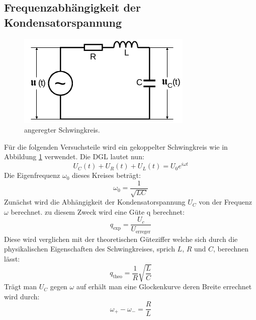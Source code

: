 \subsection{Frequenzabhängigkeit der Kondensatorspannung}

\begin{figure}[H]
  \centering
  \includegraphics{content/images/kreis2.png}
  \caption{angeregter Schwingkreis.}
  \label{fig:kreis2}
\end{figure}

Für die folgenden Versuchsteile wird ein gekoppelter Schwingkreis
wie in Abbildung \ref{fig:kreis2} verwendet. Die DGL lautet nun:
\begin{equation}
  U_C(t)+U_R(t)+U_L(t)=U_0e^{i\omega t}
  \label{eqn:kreis3}
\end{equation}
Die Eigenfrequenz $\omega_0$ dieses Kreises beträgt:
\begin{equation}
  \omega_0=\frac{1}{\sqrt{LC}}
  \label{eqn:eigen}
\end{equation}
Zunächst wird die Abhängigkeit
der Kondensatorspannung $U_C$ von der Frequenz $\omega$ berechnet.
zu diesem Zweck wird eine Güte q berechnet:
\begin{equation}
  q_\text{exp}=\frac{U_c}{U_\text{erreger}}
  \label{eqn:qexp}
\end{equation}
Diese wird verglichen mit der theoretischen Güteziffer welche sich durch die physikalischen
Eigenschaften des Schwingkreises, sprich $L$, $R$ und $C$, berechnen lässt:
\begin{equation}
  q_\text{theo}=\frac{1}{R}\sqrt{\frac{L}{C}}
    \label{eqn:qtheo}
\end{equation}
Trägt man $U_C$ gegen $\omega$ auf erhält man eine Glockenkurve deren Breite errechnet wird durch:
\begin{equation}
  \omega_+-\omega_-=\frac{R}{L}
  \label{eqn:breite}
\end{equation}

